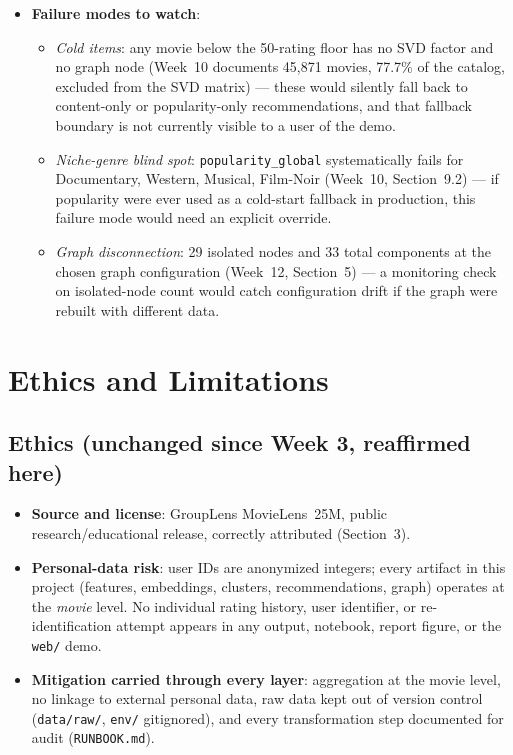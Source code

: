 \documentclass[12pt,a4paper]{article}
\begin{document}
\begin{itemize}[nosep]
    returned candidate IDs, and (if available) subsequent user action, to make a real online
    evaluation possible --- the current LOO protocol is the offline stand-in for what that log
    would enable.
  \item \textbf{Failure modes to watch}:
  \begin{itemize}[nosep]
    \item \emph{Cold items}: any movie below the 50-rating floor has no SVD factor and no graph
      node (Week~10 documents 45,871 movies, 77.7\% of the catalog, excluded from the SVD matrix)
      --- these would silently fall back to content-only or popularity-only recommendations, and
      that fallback boundary is not currently visible to a user of the demo.
    \item \emph{Niche-genre blind spot}: \texttt{popularity\_global} systematically fails for
      Documentary, Western, Musical, Film-Noir (Week~10, Section~9.2) --- if popularity were ever
      used as a cold-start fallback in production, this failure mode would need an explicit
      override.
    \item \emph{Graph disconnection}: 29 isolated nodes and 33 total components at the chosen graph
      configuration (Week~12, Section~5) --- a monitoring check on isolated-node count would catch
      configuration drift if the graph were rebuilt with different data.
  \end{itemize}
\end{itemize}

\section{Ethics and Limitations}

\subsection{Ethics (unchanged since Week 3, reaffirmed here)}

\begin{itemize}[nosep]
  \item \textbf{Source and license}: GroupLens MovieLens~25M, public research/educational release,
    correctly attributed (Section~3).
  \item \textbf{Personal-data risk}: user IDs are anonymized integers; every artifact in this
    project (features, embeddings, clusters, recommendations, graph) operates at the \emph{movie}
    level. No individual rating history, user identifier, or re-identification attempt appears in
    any output, notebook, report figure, or the \texttt{web/} demo.
  \item \textbf{Mitigation carried through every layer}: aggregation at the movie level, no linkage
    to external personal data, raw data kept out of version control (\texttt{data/raw/},
    \texttt{env/} gitignored), and every transformation step documented for audit
    (\texttt{RUNBOOK.md}).
\end{itemize}
\end{document}
